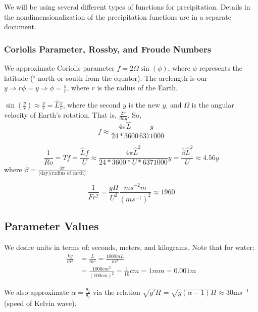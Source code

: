 \documentclass[10pt]{article}
\begin{document}
We will be using several different types of functions for precipitation. Details in the nondimensionalization of the precipitation functions are in a separate document.


\subsubsection{Coriolis Parameter, Rossby, and Froude Numbers}

We approximate Coriolis parameter $f= 2 \Omega \sin(\phi)$, where $\phi$ represents the latitude ($^{\circ}$ north or south from the equator). The arclength is our $y \Rightarrow r\phi = y \Rightarrow \phi = \frac{y}{r}$, where $r$ is the radius of the Earth. 

$\sin(\frac{y}{r})\approx \frac{y}{r} = \hat{L} \frac{y}{r}$, where the second $y$ is the new $y$, and $\Omega$ is the angular velocity of Earth's rotation. That is, $\frac{2\pi}{day}$. So, 
\begin{equation*}
f \approx \frac{4\pi\hat{L}}{24*3600}\frac{y}{6371000}
\end{equation*}

\begin{equation*}
\frac{1}{Ro} = Tf = \frac{\hat{L}f}{U} \approx \frac{4\pi \hat{L}^2}{24*3600*U*6371000} y =\frac{\bar{\beta}\hat{L}^2}{U} \approx 4.56 y
\end{equation*}
 where $\bar{\beta} = \frac{4\pi}{\text{(day)(radius of earth)}}$.

\begin{equation}
\frac{1}{Fr^2} = \frac{gH}{U^2} \frac{ms^{-2}m}{(ms^{-1})^2} \approx 1960
\end{equation}

\subsection{Parameter Values}



We desire units in terms of: seconds, meters, and kilograms. Note that for water:
\begin{align*}
\frac{kg}{m^2} &= \frac{L}{m^2} = \frac{1000 mL}{m^2}\\
&= \frac{1000 cm^3}{ (100cm)^2} = \frac{1}{10} cm = 1 mm = 0.001 m 
\end{align*}

We also approximate $\alpha = \frac{\theta_2}{\theta_1}$ via the relation $\sqrt{g'H} = \sqrt{g(\alpha -1) H} \approx 30 $m$s^{-1}$ (speed of Kelvin wave).
\end{document}
